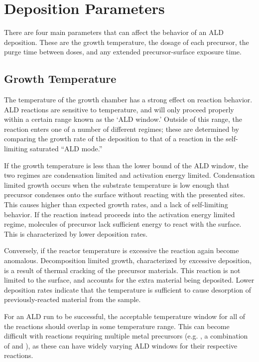 \section{Deposition Parameters}
\label{sec:SampFab-DepParams}

There are four main parameters that can affect the behavior of an ALD deposition.  These are the growth temperature, the dosage of each precursor, the purge time between doses, and any extended precursor-surface exposure time. 


\subsection{Growth Temperature}

The temperature of the growth chamber has a strong effect on reaction behavior. ALD reactions are sensitive to temperature, and will only proceed properly within a certain range known as the `ALD window.' Outside of this range, the reaction enters one of a number of different regimes; these are determined by comparing the growth rate of the deposition to that of a reaction in the self-limiting saturated ``ALD mode.'' 

If the growth temperature is less than the lower bound of the ALD window, the two regimes are condensation limited and activation energy limited. Condensation limited growth occurs when the substrate temperature is low enough that precursor condenses onto the surface without reacting with the presented sites. This causes higher than expected growth rates, and a lack of self-limiting behavior. If the reaction instead proceeds into the activation energy limited regime, molecules of precursor lack sufficient energy to react with the surface. This is characterized by lower deposition rates. 

Conversely, if the reactor temperature is excessive the reaction again become anomalous. Decomposition limited growth, characterized by excessive deposition, is a result of thermal cracking of the precursor materials. This reaction is not limited to the surface, and accounts for the extra material being deposited. Lower deposition rates indicate that the temperature is sufficient to cause desorption of previously-reacted material from the sample. 

For an ALD run to be successful, the acceptable temperature window for all of the reactions should overlap in some temperature range. This can become difficult with reactions requiring multiple metal precursors (e.g. \PTO, a combination of  and ), as these can have widely varying ALD windows for their respective reactions. 

